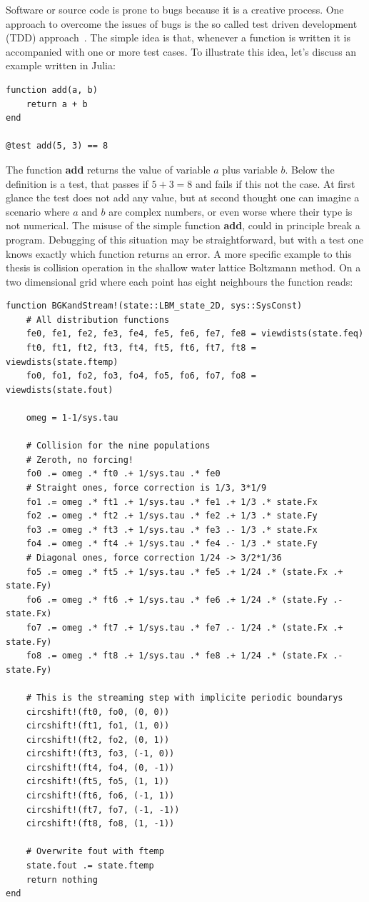 Software or source code is prone to bugs because it is a creative process.
One approach to overcome the issues of bugs is the so called test driven development (TDD) approach~\cite{beckTestdrivenDevelopmentExample2003}.
The simple idea is that, whenever a function is written it is accompanied with one or more test cases.
To illustrate this idea, let's discuss an example written in Julia:
\begin{verbatim}
function add(a, b)
    return a + b
end

@test add(5, 3) == 8
\end{verbatim}
The function \textbf{add} returns the value of variable $a$ plus variable $b$.
Below the definition is a test, that passes if $5 + 3 = 8$ and fails if this not the case.
At first glance the test does not add any value, but at second thought one can imagine a scenario where $a$ and $b$ are complex numbers, or even worse where their type is not numerical.
The misuse of the simple function \textbf{add}, could in principle break a program.
Debugging of this situation may be straightforward, but with a test one knows exactly which function returns an error.
A more specific example to this thesis is collision operation in the shallow water lattice Boltzmann method.
On a two dimensional grid where each point has eight neighbours the function reads:
\begin{verbatim}
function BGKandStream!(state::LBM_state_2D, sys::SysConst)
    # All distribution functions
    fe0, fe1, fe2, fe3, fe4, fe5, fe6, fe7, fe8 = viewdists(state.feq)
    ft0, ft1, ft2, ft3, ft4, ft5, ft6, ft7, ft8 = viewdists(state.ftemp)
    fo0, fo1, fo2, fo3, fo4, fo5, fo6, fo7, fo8 = viewdists(state.fout)

    omeg = 1-1/sys.tau

    # Collision for the nine populations
    # Zeroth, no forcing!
    fo0 .= omeg .* ft0 .+ 1/sys.tau .* fe0
    # Straight ones, force correction is 1/3, 3*1/9
    fo1 .= omeg .* ft1 .+ 1/sys.tau .* fe1 .+ 1/3 .* state.Fx
    fo2 .= omeg .* ft2 .+ 1/sys.tau .* fe2 .+ 1/3 .* state.Fy
    fo3 .= omeg .* ft3 .+ 1/sys.tau .* fe3 .- 1/3 .* state.Fx
    fo4 .= omeg .* ft4 .+ 1/sys.tau .* fe4 .- 1/3 .* state.Fy
    # Diagonal ones, force correction 1/24 -> 3/2*1/36
    fo5 .= omeg .* ft5 .+ 1/sys.tau .* fe5 .+ 1/24 .* (state.Fx .+ state.Fy)
    fo6 .= omeg .* ft6 .+ 1/sys.tau .* fe6 .+ 1/24 .* (state.Fy .- state.Fx)
    fo7 .= omeg .* ft7 .+ 1/sys.tau .* fe7 .- 1/24 .* (state.Fx .+ state.Fy)
    fo8 .= omeg .* ft8 .+ 1/sys.tau .* fe8 .+ 1/24 .* (state.Fx .- state.Fy)

    # This is the streaming step with implicite periodic boundarys
    circshift!(ft0, fo0, (0, 0))
    circshift!(ft1, fo1, (1, 0))
    circshift!(ft2, fo2, (0, 1))
    circshift!(ft3, fo3, (-1, 0))
    circshift!(ft4, fo4, (0, -1))
    circshift!(ft5, fo5, (1, 1))
    circshift!(ft6, fo6, (-1, 1))
    circshift!(ft7, fo7, (-1, -1))
    circshift!(ft8, fo8, (1, -1))
    
    # Overwrite fout with ftemp
    state.fout .= state.ftemp
    return nothing
end
\end{verbatim}
